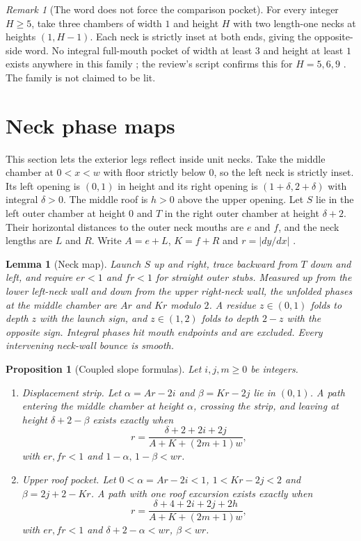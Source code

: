 \documentclass[11pt]{article}
\newtheorem{lemma}{Lemma}
\newtheorem{proposition}{Proposition}
\theoremstyle{definition}
\theoremstyle{remark}
\newtheorem{remark}{Remark}
\begin{document}
\begin{remark}[The word does not force the comparison pocket]
For every integer $H\ge 5$, take three chambers of width $1$ and height $H$ with
two length-one necks at heights $(1,H-1)$. Each neck is strictly inset at both
ends, giving the opposite-side word. No integral full-mouth pocket of width at
least $3$ and height at least $1$ exists anywhere in this family \cite{R3}; the
review's script confirms this for $H=5,6,9$ \cite{d201}. The family is not
claimed to be lit.
\end{remark}

\section{Neck phase maps}\label{sec:neck}
This section lets the exterior legs reflect inside unit necks. Take the middle
chamber at $0<x<w$ with floor strictly below $0$, so the left neck is strictly
inset. Its left opening is $(0,1)$ in height and its right opening is
$(1+\delta,2+\delta)$ with integral $\delta>0$. The middle roof is $h>0$ above
the upper opening. Let $S$ lie in the left outer chamber at height $0$ and $T$
in the right outer chamber at height $\delta+2$. Their horizontal distances to
the outer neck mouths are $e$ and $f$, and the neck lengths are $L$ and $R$.
Write $A=e+L$, $K=f+R$ and $r=|dy/dx|$ \cite{R4}.

\begin{lemma}[Neck map]\label{lem:neck}
Launch $S$ up and right, trace backward from $T$ down and left, and require
$er<1$ and $fr<1$ for straight outer stubs. Measured up from the lower left-neck
wall and down from the upper right-neck wall, the unfolded phases at the middle
chamber are $Ar$ and $Kr$ modulo $2$. A residue $z\in(0,1)$ folds to depth $z$
with the launch sign, and $z\in(1,2)$ folds to depth $2-z$ with the opposite
sign. Integral phases hit mouth endpoints and are excluded. Every intervening
neck-wall bounce is smooth.
\end{lemma}

\begin{proposition}[Coupled slope formulas]\label{prop:slopes}
Let $i,j,m\ge 0$ be integers.
\begin{enumerate}
\item \emph{Displacement strip.} Let $\alpha=Ar-2i$ and $\beta=Kr-2j$ lie in
$(0,1)$. A path entering the middle chamber at height $\alpha$, crossing the
strip, and leaving at height $\delta+2-\beta$ exists exactly when
\[
r=\frac{\delta+2+2i+2j}{A+K+(2m+1)w},
\]
with $er,fr<1$ and $1-\alpha,\,1-\beta<wr$.
\item \emph{Upper roof pocket.} Let $0<\alpha=Ar-2i<1$, $1<Kr-2j<2$ and
$\beta=2j+2-Kr$. A path with one roof excursion exists exactly when
\[
r=\frac{\delta+4+2i+2j+2h}{A+K+(2m+1)w},
\]
with $er,fr<1$ and $\delta+2-\alpha<wr$, $\beta<wr$.
\end{enumerate}
\end{proposition}
\end{document}
